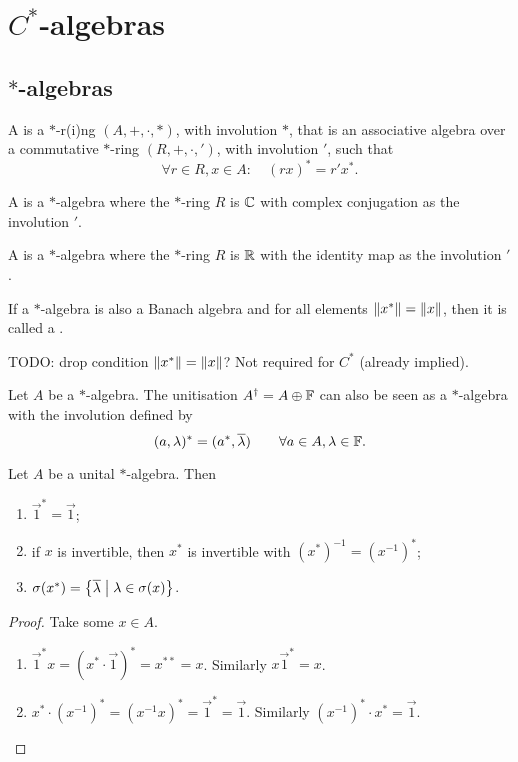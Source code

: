 \chapter{$C^*$-algebras}
\section{$*$-algebras}
\begin{definition}
A  is a $*$-r(i)ng $(A,+,\cdot, *)$, with involution $*$, that is an associative algebra over a commutative $*$-ring $(R,+,\cdot, ')$, with involution $'$,
such that
\[ \forall r\in R, x\in A: \quad (rx)^* = r'x^*. \]

A  is a $*$-algebra where the $*$-ring $R$ is $\mathbb{C}$ with complex conjugation as the involution $'$.

A  is a $*$-algebra where the $*$-ring $R$ is $\mathbb{R}$ with the identity map as the involution $'$.

If a $*$-algebra is also a Banach algebra and for all elements $\lVert x^*\rVert =\lVert x\rVert$, then it is called a .
\end{definition}
TODO: drop condition $\lVert x^*\rVert =\lVert x\rVert$? Not required for $C^*$ (already implied).

\begin{lemma}
Let $A$ be a $*$-algebra. The unitisation $A^\dagger = A\oplus \mathbb{F}$ can also be seen as a $*$-algebra with the involution defined by
\[ (a, \lambda)^* = (a^*, \overline{\lambda}) \qquad \forall a\in A, \lambda\in \mathbb{F}.\]
\end{lemma}
\begin{lemma} \label{elementaryStarLemma}
Let $A$ be a unital $*$-algebra. Then
\begin{enumerate}
\item $\vec{1}^* = \vec{1}$;
\item if $x$ is invertible, then $x^*$ is invertible with $(x^*)^{-1} = (x^{-1})^*$;
\item $\sigma(x^*) = \left\{ \overline{\lambda} \;\middle|\; \lambda \in \sigma(x) \right\}$.
\end{enumerate}
\end{lemma}
\begin{proof}
Take some $x\in A$.
\begin{enumerate}
\item $\vec{1}^* x = (x^*\cdot \vec{1})^* = x^{**} = x$.
Similarly $x\vec{1}^* = x$.
\item $x^*\cdot (x^{-1})^* = (x^{-1}x)^* = \vec{1}^* = \vec{1}$. Similarly $(x^{-1})^*\cdot x^* = \vec{1}$.
\end{enumerate}
\end{proof}

